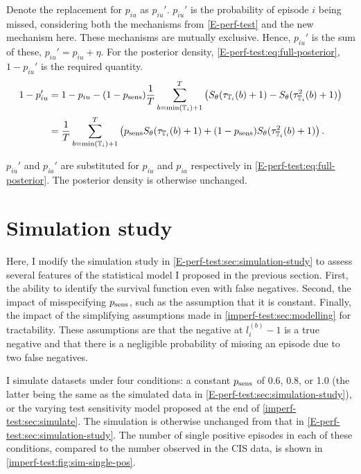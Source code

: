 \documentclass[thesis.tex]{subfiles}
\begin{document}
Denote the replacement for $p_{iu}$ as $p_{iu}'$.
$p_{iu}'$ is the probability of episode $i$ being missed, considering both the mechanisms from \cref{E-perf-test} and the new mechanism here.
These mechanisms are mutually exclusive.
Hence, $p_{iu}'$ is the sum of these, $p_{iu}' = p_{iu} + \eta$.
For the posterior density, \cref{E-perf-test:eq:full-posterior}, $1 - p_{iu}'$ is the required quantity.
\begin{align}
1 - p_{iu}'
&= 1 - p_{iu} - (1 - p_\text{sens})\frac{1}{T} \sum_{b=\min(\mathbb{T}_i) + 1}^T \left( S_\theta(\tau_{\mathbb{T}_i}(b) + 1) - S_\theta(\tau^2_{\mathbb{T}_i}(b) + 1) \right) \\
&= \frac{1}{T} \sum_{b=\min(\mathbb{T}_i) + 1}^T \left( p_\text{sens} S_\theta(\tau_{\mathbb{T}_i}(b) + 1) + (1 - p_\text{sens}) S_\theta(\tau^2_{\mathbb{T}_i}(b) + 1)\right).
\label{imperf-test:eq:pit-prime}
\end{align}

$p_{iu}'$ and $p_{ia}'$ are substituted for $p_{iu}$ and $p_{ia}$ respectively in \cref{E-perf-test:eq:full-posterior}.
The posterior density is otherwise unchanged.

\section{Simulation study} \label{imperf-test:sec:sim-study-results}

Here, I modify the simulation study in \cref{E-perf-test:sec:simulation-study} to assess several features of the statistical model I proposed in the previous section.
First, the ability to identify the survival function even with false negatives.
Second, the impact of misspecifying $p_\text{sens}$, such as the assumption that it is constant.
Finally, the impact of the simplifying assumptions made in \cref{imperf-test:sec:modelling} for tractability.
These assumptions are that the negative at $l^{(b)}_i - 1$ is a true negative and that there is a negligible probability of missing an episode due to two false negatives.

I simulate datasets under four conditions: a constant $p_\text{sens}$ of 0.6, 0.8, or 1.0 (the latter being the same as the simulated data in \cref{E-perf-test:sec:simulation-study}), or the varying test sensitivity model proposed at the end of \cref{imperf-test:sec:simulate}.
The simulation is otherwise unchanged from that in \cref{E-perf-test:sec:simulation-study}.
The number of single positive episodes in each of these conditions, compared to the number observed in the CIS data, is shown in \cref{imperf-test:fig:sim-single-pos}.
\end{document}
